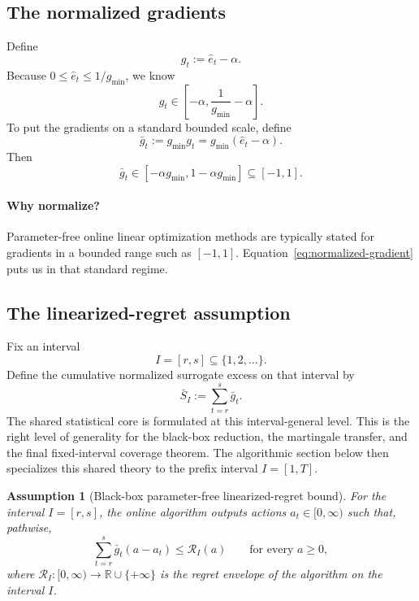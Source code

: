 \documentclass[11pt]{article}
\newtheorem{assumption}{Assumption}
\newcommand{\R}{\mathbb{R}}
\newcommand{\1}{\mathbf{1}}
\begin{document}
\subsection{The normalized gradients}

Define
\[
g_t:=\hat e_t-\alpha.
\]
Because $0\le \hat e_t\le 1/g_{\min}$, we know
\[
g_t\in\left[-\alpha,\frac{1}{g_{\min}}-\alpha\right].
\]
To put the gradients on a standard bounded scale, define
\begin{equation}
\label{eq:normalized-gradient}
\bar g_t:=g_{\min}g_t=g_{\min}(\hat e_t-\alpha).
\end{equation}
Then
\[
\bar g_t\in[-\alpha g_{\min},1-\alpha g_{\min}]\subseteq[-1,1].
\]

\paragraph{Why normalize?}
Parameter-free online linear optimization methods are typically stated for gradients in a bounded range such as $[-1,1]$. Equation~\eqref{eq:normalized-gradient} puts us in that standard regime.

\subsection{The linearized-regret assumption}

Fix an interval
\[
I=[r,s]\subseteq\{1,2,\dots\}.
\]
Define the cumulative normalized surrogate excess on that interval by
\[
\bar S_I:=\sum_{t=r}^s \bar g_t.
\]
The shared statistical core is formulated at this interval-general level. This is the right level of generality for the black-box reduction, the martingale transfer, and the final fixed-interval coverage theorem. The algorithmic section below then specializes this shared theory to the prefix interval $I=[1,T]$.

\begin{assumption}[Black-box parameter-free linearized-regret bound]
\label{ass:linreg-main}
For the interval $I=[r,s]$, the online algorithm outputs actions $a_t\in[0,\infty)$ such that, pathwise,
\begin{equation}
\label{eq:linreg-assumption}
\sum_{t=r}^s \bar g_t(a-a_t)\le \mathcal R_I(a)
\qquad\text{for every }a\ge 0,
\end{equation}
where $\mathcal R_I:[0,\infty)\to\R\cup\{+\infty\}$ is the regret envelope of the algorithm on the interval $I$.
\end{assumption}
\end{document}
